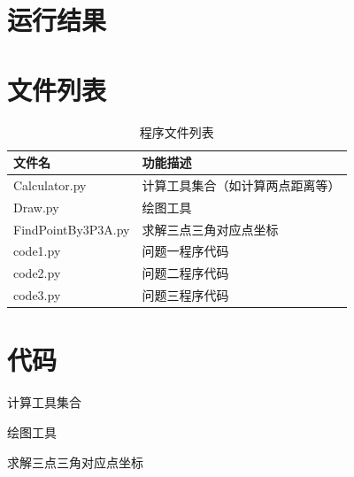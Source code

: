 \documentclass[withoutpreface,bwprint]{cumcmthesis} %
\begin{document}



\begin{appendices}

\section{运行结果}


\section{文件列表}
\begin{table}[H]
    \caption{程序文件列表}
    \centering
    \begin{tabularx}{\textwidth}{l X}
        \bottomrule
        文件名 & 功能描述 \\
        \midrule
        Calculator.py & 计算工具集合（如计算两点距离等） \\
        Draw.py & 绘图工具 \\
        FindPointBy3P3A.py & 求解三点三角对应点坐标 \\
        code1.py & 问题一程序代码 \\
        code2.py & 问题二程序代码 \\
        code3.py & 问题三程序代码 \\
        \bottomrule
    \end{tabularx}
    \label{tab:文件列表}
\end{table}

\section{代码}
计算工具集合

绘图工具

求解三点三角对应点坐标


\end{appendices}
\end{document}
